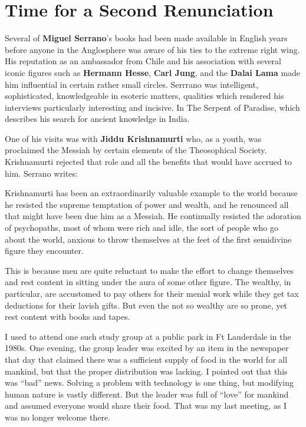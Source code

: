 \section{Time for a Second Renunciation}

Several of \textbf{Miguel Serrano}'s books had been made available in English years before anyone in the Anglosphere was aware of his ties to the extreme right wing. His reputation as an ambassador from Chile and his association with several iconic figures such as \textbf{Hermann Hesse}, \textbf{Carl Jung}, and the \textbf{Dalai Lama} made him influential in certain rather small circles. Serrrano was intelligent, sophisticated, knowledgeable in esoteric matters, qualities which rendered his interviews particularly interesting and incisive. In The Serpent of Paradise, which describes his search for ancient knowledge in India.

One of his visits was with \textbf{Jiddu Krishnamurti} who, as a youth, was proclaimed the Messiah by certain elements of the Theosophical Society. Krishnamurti rejected that role and all the benefits that would have accrued to him. Serrano writes:

\begin{quotex}
Krishnamurti has been an extraordinarily valuable example to the world because he resisted the supreme temptation of power and wealth, and he renounced all that might have been due him as a Messiah. He continually resisted the adoration of psychopaths, most of whom were rich and idle, the sort of people who go about the world, anxious to throw themselves at the feet of the first semidivine figure they encounter.
\end{quotex}

This is because men are quite reluctant to make the effort to change themselves and rest content in sitting under the aura of some other figure. The wealthy, in particular, are accustomed to pay others for their menial work while they get tax deductions for their lavish gifts. But even the not so wealthy are so prone, yet rest content with books and tapes.

I used to attend one such study group at a public park in Ft Lauderdale in the 1980s. One evening, the group leader was excited by an item in the newspaper that day that claimed there was a sufficient supply of food in the world for all mankind, but that the proper distribution was lacking. I pointed out that this was ``bad'' news. Solving a problem with technology is one thing, but modifying human nature is vastly different. But the leader was full of ``love'' for mankind and assumed everyone would share their food. That was my last meeting, as I was no longer welcome there.

